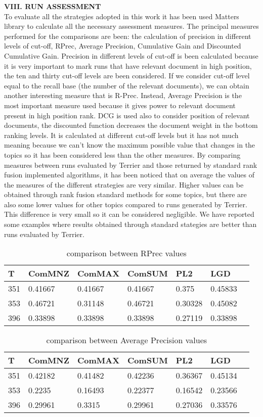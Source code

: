 \documentclass[12pt,journal]{IEEEtran}
\begin{document}
\textbf{VIII.	RUN ASSESSMENT} \\
To evaluate all the strategies adopted in this work it has been used Matters library to calculate all the necessary assessment measures.
The principal measures performed for the comparisons are been: the calculation of precision in different levels of cut-off, RPrec, Average Precision, Cumulative Gain and Discounted Cumulative Gain.
Precision in different levels of cut-off is been calculated because it is very important to mark runs that have relevant document in high position, the ten and thirty cut-off levels are been considered. If we consider cut-off level equal to the recall base (the number of the relevant documents), we can obtain another interesting measure that is R-Prec.
Instead, Average Precision is the most important measure used because it gives power to relevant document present in high position rank.
DCG is used also to consider position of relevant documents, the discounted function decreases the document weight in the bottom ranking levels. It is calculated at different cut-off levels but it has not much meaning because we can’t know the maximum possible value that changes in the topics so it has been considered less than the other measures. 
By comparing measures between runs evaluated by Terrier and those returned by standard rank fusion implemented algorithms, it has been noticed that on average the values of the measures of the different strategies are very similar. Higher values can be obtained through rank fusion standard methods for some topics, but there are also some lower values for other topics compared to runs generated by Terrier. This difference is very small so it can be considered negligible. We have reported some examples where results obtained through standard stategies are better than runs evaluated by Terrier.
\begin{table}[h!]
\centering
\caption{comparison between RPrec values}
\begin{tabular}{|l|l|l|l|l|l|l|}
\hline
T   & ComMNZ  & ComMAX  & ComSUM  & PL2  & LGD \\ \hline
351 & 0.41667 & 0.41667 & 0.41667 & 0.375   & 0.45833 \\ \hline
353 & 0.46721 & 0.31148 & 0.46721 & 0.30328 & 0.45082 \\ \hline
396 & 0.33898 & 0.33898 & 0.33898 & 0.27119 & 0.33898 \\ \hline 
\end{tabular}
\end{table}

\begin{table}[h!]
\centering
\caption{comparison between Average Precision values}
\begin{tabular}{|l|l|l|l|l|l|l|}
\hline
T   & ComMNZ  & ComMAX  & ComSUM  & PL2  & LGD  \\ \hline
351 & 0.42182 & 0.41482 & 0.42236 & 0.36367 & 0.45134 \\ \hline
353 & 0.2235  & 0.16493 & 0.22377 & 0.16542 & 0.23566 \\ \hline
396 & 0.29961 & 0.3315  & 0.29961 & 0.27036 & 0.33576 \\ \hline
\end{tabular}
\end{table} 
\end{document}
